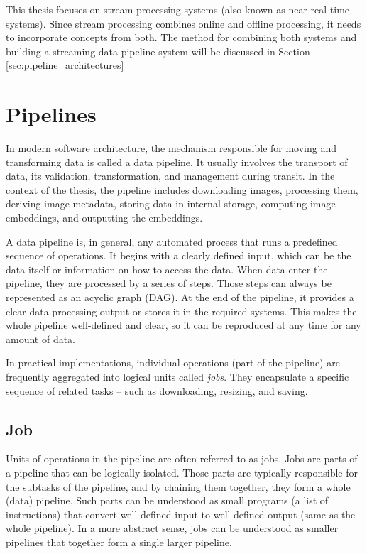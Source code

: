 This thesis focuses on stream processing systems (also known as near-real-time systems). Since stream processing combines online and offline processing, it needs to incorporate concepts from both. The method for combining both systems and building a streaming data pipeline system will be discussed in Section \ref{sec:pipeline_architectures} 

\section{Pipelines}
In modern software architecture, the mechanism responsible for moving and transforming data is called a data pipeline. It usually involves the transport of data, its validation, transformation, and management during transit. In the context of the thesis, the pipeline includes downloading images, processing them, deriving image metadata, storing data in internal storage, computing image embeddings, and outputting the embeddings. \cite{kleppmann_designing_2017}

A data pipeline is, in general, any automated process that runs a predefined sequence of operations. It begins with a clearly defined input, which can be the data itself or information on how to access the data. When data enter the pipeline, they are processed by a series of steps. Those steps can always be represented as an acyclic graph (DAG). At the end of the pipeline, it provides a clear data-processing output or stores it in the required systems. This makes the whole pipeline well-defined and clear, so it can be reproduced at any time for any amount of data. \cite{kleppmann_designing_2017}

In practical implementations, individual operations (part of the pipeline) are frequently aggregated into logical units called \textit{jobs}. They encapsulate a specific sequence of related tasks -- such as downloading, resizing, and saving.

\subsection{Job}\label{sec:job}
Units of operations in the pipeline are often referred to as jobs. Jobs are parts of a pipeline that can be logically isolated. Those parts are typically responsible for the subtasks of the pipeline, and by chaining them together, they form a whole (data) pipeline. Such parts can be understood as small programs (a list of instructions) that convert well-defined input to well-defined output (same as the whole pipeline). In a more abstract sense, jobs can be understood as smaller pipelines that together form a single larger pipeline.

